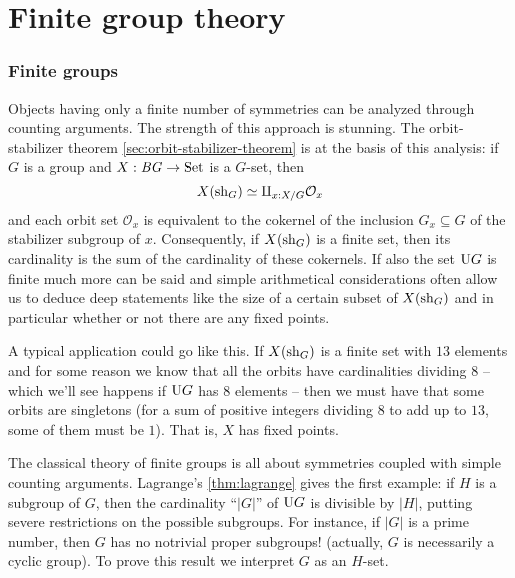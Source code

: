 \chapter{Finite group theory}
\label{ch:fingp}

\subsection{Finite groups}
\label{sec:fingp}

Objects having only a finite number of symmetries can be analyzed through counting arguments.  The strength of this approach is stunning.  The orbit-stabilizer theorem \cref{sec:orbit-stabilizer-theorem} is at the basis of this analysis: if $G$ is a group and $X:\mathit{B}\mathit{G}\to\mathrm{Set}$ is a $G$-set, then
$$X(\mathrm{sh}_G)\simeq \amalg_{x:X/G}\mathcal O_x$$
and each orbit set $\mathcal O_x$ is equivalent to the cokernel of the inclusion $G_x\subseteq G$ of the stabilizer subgroup of $x$.
Consequently, if $X(\mathrm{sh}_G)$ is a finite set, then its cardinality is the sum of the cardinality of these cokernels.  If also the set $\mathrm{U} G$ is finite much more can be said and simple arithmetical considerations often allow us to deduce deep statements like the size of a certain subset of $X(\mathrm{sh}_G)$ and in particular whether or not there are any fixed points.

\begin{example}
  A typical application could go like this.  
If $X(\mathrm{sh}_G)$ is a finite set with $13$ elements and for some reason we know that all the orbits have cardinalities dividing $8$ -- which we'll see happens if $\mathrm{U} G$ has $8$ elements -- then we must have that some orbits are singletons (for a sum of positive integers dividing $8$ to add up to $13$, some of them must be $1$).
That is, $X$ has fixed points.
\end{example}

The classical theory of finite groups is all about symmetries coupled with simple counting arguments. 
Lagrange's \cref{thm:lagrange} gives the first example: if $H$ is a subgroup of $G$, then the cardinality ``$|G|$'' of $\mathrm{U} G$ is divisible by $|H|$, putting severe restrictions on the possible subgroups.  For instance, if $|G|$ is a prime number, then $G$ has no notrivial proper subgroups! (actually, $G$ is necessarily a cyclic group).  To prove this result we interpret $G$ as an $H$-set.


